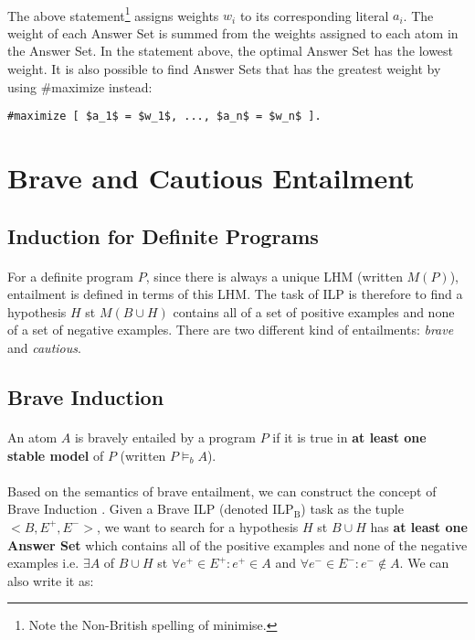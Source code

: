 \documentclass{article}
\theoremstyle{plain}
\theoremstyle{definition}
\begin{document}
\begin{multicols}{2}
\paragraph{} The above statement\footnote{Note the Non-British spelling of minimise.} assigns weights $w_i$ to its corresponding literal $a_i$. The weight of each Answer Set is summed from the weights assigned to each atom in the Answer Set. In the statement above, the optimal Answer Set has the lowest weight. It is also possible to find Answer Sets that has the greatest weight by using \#maximize instead:

\begin{lstlisting}[mathescape=true]
#maximize [ $a_1$ = $w_1$, ..., $a_n$ = $w_n$ ].
\end{lstlisting}

\section{Brave and Cautious Entailment}

\subsection{Induction for Definite Programs}

\paragraph{} For a definite program $P$, since there is always a unique LHM (written $M(P)$), entailment is defined in terms of this LHM. The task of ILP is therefore to find a hypothesis $H$ st $M(B \cup H)$ contains all of a set of positive examples and none of a set of negative examples. There are two different kind of entailments: \textit{brave} and \textit{cautious}. 

\subsection{Brave Induction}
\paragraph{} An atom $A$ is bravely entailed by a program $P$ if it is true in \textbf{at least one stable model} of $P$ (written $P \models_b A$).

\paragraph{} Based on the semantics of brave entailment, we can construct the concept of Brave Induction  \cite{sakama08}. Given a Brave ILP (denoted $\text{ILP}_\text{B}$) task as the tuple $<B, E^+, E^->$, we want to search for a hypothesis $H$ st $B \cup H$ has \textbf{at least one Answer Set} which contains all of the positive examples and none of the negative examples i.e. $\exists A$ of $B \cup H$ st $\forall e^+ \in E^+: e^+ \in A$ and $\forall e^- \in E^-: e^- \not\in A$. We can also write it as:


\end{multicols}
\end{document}
